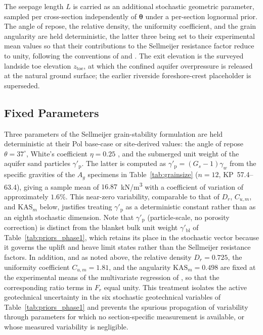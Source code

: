 The seepage length $L$ is carried as an additional stochastic geometric parameter, sampled per cross-section independently of $\boldsymbol{\theta}$ under a per-section lognormal prior. The angle of repose, the relative density, the uniformity coefficient, and the grain angularity are held deterministic, the latter three being set to their experimental mean values so that their contributions to the Sellmeijer resistance factor reduce to unity, following the conventions of \textcite{sellmeijer_2011} and \textcite{pol_sie_2024}. The exit elevation is the surveyed landside toe elevation $z_\mathrm{toe}$, at which the confined aquifer overpressure is released at the natural ground surface; the earlier riverside foreshore-crest placeholder is superseded.

\subsection{Fixed Parameters}
\label{subsec: Fixed Parameters Prior}

Three parameters of the Sellmeijer grain-stability formulation are held deterministic at their Pol base-case or site-derived values: the angle of repose $\theta = 37^\circ$, White's coefficient $\eta = 0.25$ \parencite{pol_sie_2024}, and the submerged unit weight of the aquifer sand particles $\gamma'_\mathrm{p}$. The latter is computed as $\gamma'_\mathrm{p} = (G_s-1)\gamma_w$ from the specific gravities of the $A_g$ specimens in Table~\ref{tab:grainsize} ($n=12$, KP~57.4--63.4), giving a sample mean of $16.87$~kN/m\textsuperscript{3} with a coefficient of variation of approximately $1.6\%$. This near-zero variability, comparable to that of $D_r$, $C_{u,m}$, and $\mathrm{KAS}_m$ below, justifies treating $\gamma'_\mathrm{p}$ as a deterministic constant rather than as an eighth stochastic dimension. Note that $\gamma'_\mathrm{p}$ (particle-scale, no porosity correction) is distinct from the blanket bulk unit weight $\gamma'_\mathrm{bl}$ of Table~\ref{tab:priors_phase1}, which retains its place in the stochastic vector because it governs the uplift and heave limit states rather than the Sellmeijer resistance factors.  In addition, and as noted above, the relative density $D_r = 0.725$, the uniformity coefficient $C_{u,m} = 1.81$, and the angularity $\mathrm{KAS}_m = 0.498$ are fixed at the experimental means of the multivariate regression of \textcite{sellmeijer_2011}, so that the corresponding ratio terms in $F_r$ equal unity. This treatment isolates the active geotechnical uncertainty in the six stochastic geotechnical variables of Table~\ref{tab:priors_phase1} and prevents the spurious propagation of variability through parameters for which no section-specific measurement is available, or whose measured variability is negligible.

